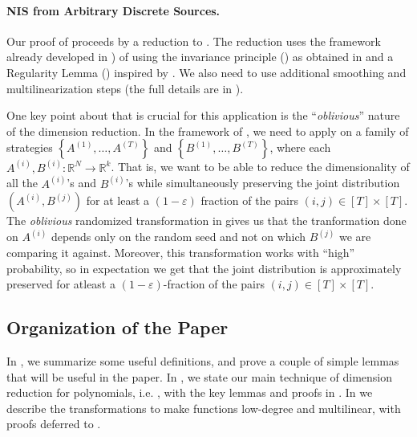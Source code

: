 \documentclass[11pt]{article}
\newcommand{\inbrace}[1]{\left \{ #1 \right \}}
\newcommand{\set}[1]{\inbrace{#1}}
\newcommand{\eps}{\varepsilon}
\newcommand{\bbR}{{\mathbb R}}
\begin{document}
\paragraph{NIS from Arbitrary Discrete Sources.} Our proof of  proceeds by a reduction to . The reduction uses the framework already developed in \cite{GKS_NIS_decidable}) of using the invariance principle () as obtained in \cite{mossel2010gaussianbounds,isaksson2012maximally} and a Regularity Lemma () inspired by \cite{diakonikolas2010regularity}. We also need to use additional smoothing and multilinearization steps (the full details are in ).

One key point about  that is crucial for this application is the ``{\em oblivious}'' nature of the dimension reduction. In the framework of \cite{GKS_NIS_decidable}, we need to apply  on a family of strategies $\set{A^{(1)}, \ldots, A^{(T)}}$ and $\set{B^{(1)}, \ldots, B^{(T)}}$, where each $A^{(i)}, B^{(i)} : \bbR^N \to \bbR^k$. That is, we want to be able to reduce the dimensionality of all the $A^{(i)}$'s and $B^{(i)}$'s while simultaneously preserving the joint distribution $(A^{(i)}, B^{(j)})$ for at least a $(1-\eps)$ fraction of the pairs $(i, j) \in [T] \times [T]$. The {\em oblivious} randomized transformation in  gives us that the tranformation done on $A^{(i)}$ depends only on the random seed and not on which $B^{(j)}$ we are comparing it against. Moreover, this transformation works with ``high'' probability, so in expectation we get that the joint distribution is approximately preserved for atleast a $(1-\eps)$-fraction of the pairs $(i,j) \in [T] \times [T]$.

\subsection{Organization of the Paper}
In , we summarize some useful definitions, and prove a couple of simple lemmas that will be useful in the paper. In , we state our main technique of dimension reduction for polynomials, i.e. , with the key lemmas and proofs in . In  we describe the transformations to make functions low-degree and multilinear, with proofs deferred to .
\end{document}
